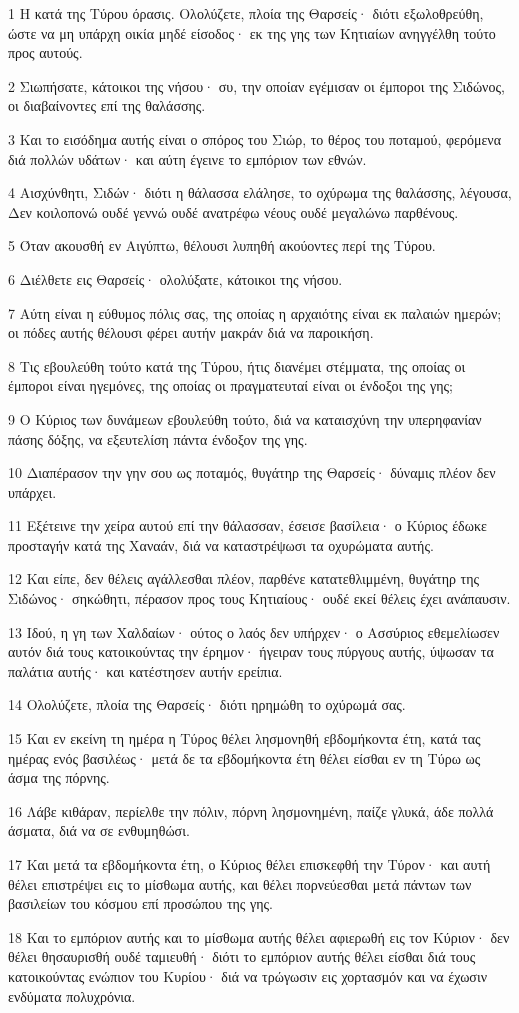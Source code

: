 \par 1 Η κατά της Τύρου όρασις. Ολολύζετε, πλοία της Θαρσείς· διότι εξωλοθρεύθη, ώστε να μη υπάρχη οικία μηδέ είσοδος· εκ της γης των Κητιαίων ανηγγέλθη τούτο προς αυτούς.
\par 2 Σιωπήσατε, κάτοικοι της νήσου· συ, την οποίαν εγέμισαν οι έμποροι της Σιδώνος, οι διαβαίνοντες επί της θαλάσσης.
\par 3 Και το εισόδημα αυτής είναι ο σπόρος του Σιώρ, το θέρος του ποταμού, φερόμενα διά πολλών υδάτων· και αύτη έγεινε το εμπόριον των εθνών.
\par 4 Αισχύνθητι, Σιδών· διότι η θάλασσα ελάλησε, το οχύρωμα της θαλάσσης, λέγουσα, Δεν κοιλοπονώ ουδέ γεννώ ουδέ ανατρέφω νέους ουδέ μεγαλώνω παρθένους.
\par 5 Όταν ακουσθή εν Αιγύπτω, θέλουσι λυπηθή ακούοντες περί της Τύρου.
\par 6 Διέλθετε εις Θαρσείς· ολολύξατε, κάτοικοι της νήσου.
\par 7 Αύτη είναι η εύθυμος πόλις σας, της οποίας η αρχαιότης είναι εκ παλαιών ημερών; οι πόδες αυτής θέλουσι φέρει αυτήν μακράν διά να παροικήση.
\par 8 Τις εβουλεύθη τούτο κατά της Τύρου, ήτις διανέμει στέμματα, της οποίας οι έμποροι είναι ηγεμόνες, της οποίας οι πραγματευταί είναι οι ένδοξοι της γης;
\par 9 Ο Κύριος των δυνάμεων εβουλεύθη τούτο, διά να καταισχύνη την υπερηφανίαν πάσης δόξης, να εξευτελίση πάντα ένδοξον της γης.
\par 10 Διαπέρασον την γην σου ως ποταμός, θυγάτηρ της Θαρσείς· δύναμις πλέον δεν υπάρχει.
\par 11 Εξέτεινε την χείρα αυτού επί την θάλασσαν, έσεισε βασίλεια· ο Κύριος έδωκε προσταγήν κατά της Χαναάν, διά να καταστρέψωσι τα οχυρώματα αυτής.
\par 12 Και είπε, δεν θέλεις αγάλλεσθαι πλέον, παρθένε κατατεθλιμμένη, θυγάτηρ της Σιδώνος· σηκώθητι, πέρασον προς τους Κητιαίους· ουδέ εκεί θέλεις έχει ανάπαυσιν.
\par 13 Ιδού, η γη των Χαλδαίων· ούτος ο λαός δεν υπήρχεν· ο Ασσύριος εθεμελίωσεν αυτόν διά τους κατοικούντας την έρημον· ήγειραν τους πύργους αυτής, ύψωσαν τα παλάτια αυτής· και κατέστησεν αυτήν ερείπια.
\par 14 Ολολύζετε, πλοία της Θαρσείς· διότι ηρημώθη το οχύρωμά σας.
\par 15 Και εν εκείνη τη ημέρα η Τύρος θέλει λησμονηθή εβδομήκοντα έτη, κατά τας ημέρας ενός βασιλέως· μετά δε τα εβδομήκοντα έτη θέλει είσθαι εν τη Τύρω ως άσμα της πόρνης.
\par 16 Λάβε κιθάραν, περίελθε την πόλιν, πόρνη λησμονημένη, παίζε γλυκά, άδε πολλά άσματα, διά να σε ενθυμηθώσι.
\par 17 Και μετά τα εβδομήκοντα έτη, ο Κύριος θέλει επισκεφθή την Τύρον· και αυτή θέλει επιστρέψει εις το μίσθωμα αυτής, και θέλει πορνεύεσθαι μετά πάντων των βασιλείων του κόσμου επί προσώπου της γης.
\par 18 Και το εμπόριον αυτής και το μίσθωμα αυτής θέλει αφιερωθή εις τον Κύριον· δεν θέλει θησαυρισθή ουδέ ταμιευθή· διότι το εμπόριον αυτής θέλει είσθαι διά τους κατοικούντας ενώπιον του Κυρίου· διά να τρώγωσιν εις χορτασμόν και να έχωσιν ενδύματα πολυχρόνια.

